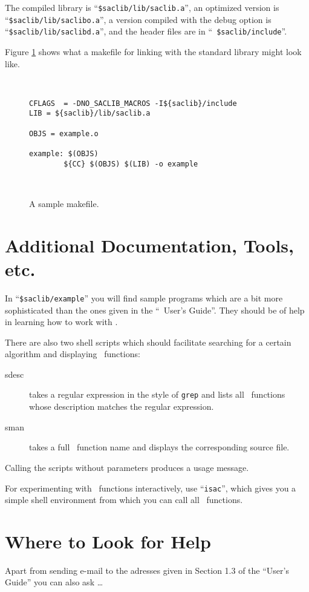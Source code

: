 \documentclass{article}
\begin{document}
\sloppy

The compiled library is ``{\tt \$saclib/lib/saclib.a}'', an optimized version
is ``{\tt \$saclib/lib/saclibo.a}'', a version compiled with the debug option
is ``{\tt \$saclib/lib/saclibd.a}'', and the header files are in ``{\tt
\$saclib/include}''.

Figure \ref{fMF} shows what a makefile for linking with the standard
library might look like.

\begin{figure}[htb]
\ \hrulefill\ \small
\begin{verbatim}
CFLAGS  = -DNO_SACLIB_MACROS -I${saclib}/include
LIB = ${saclib}/lib/saclib.a

OBJS = example.o

example: $(OBJS)
        ${CC} $(OBJS) $(LIB) -o example
\end{verbatim}
\ \hrulefill\ \normalsize
\caption{A sample makefile.}
\label{fMF}
\end{figure}

\fussy

\section{Additional Documentation, Tools, etc.}

In ``{\tt \$saclib/example}'' you will find sample programs which are a bit
more sophisticated than the ones given in the ``\saclib\ User's Guide''. They
should be of help in learning how to work with \saclib.

There are also two shell scripts which should facilitate searching for a
certain algorithm and displaying \saclib\ functions:
\begin{description}
\item[sdesc]
  takes a regular expression in the style of {\tt grep} and lists all
  \saclib\ functions whose description matches the regular expression.
\item[sman]
  takes a full \saclib\ function name and displays the corresponding source
  file.
\end{description}
Calling the scripts without parameters produces a usage message.

For experimenting with \saclib\ functions interactively, use ``{\tt isac}'',
which gives you a simple shell environment from which you can call all
\saclib\ functions.


\section{Where to Look for Help}

Apart from sending e-mail to the adresses given in Section 1.3 of the ``User's
Guide'' you can also ask \ldots
\end{document}
